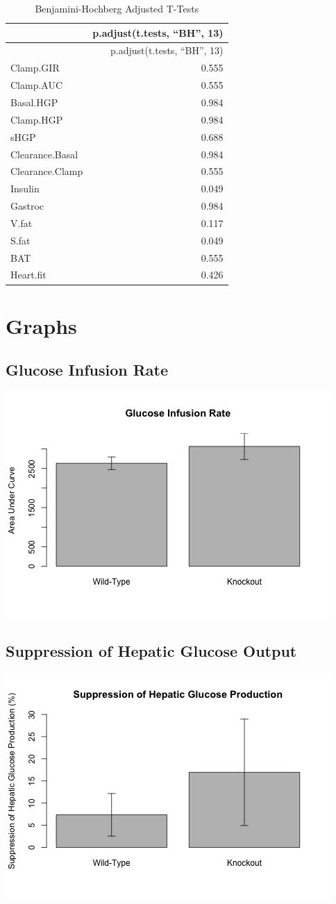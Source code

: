 \documentclass[]{article}
\begin{document}
\begin{longtable}[]{@{}lr@{}}
\caption{Benjamini-Hochberg Adjusted T-Tests}\tabularnewline
\toprule
& p.adjust(t.tests, ``BH'', 13)\tabularnewline
\midrule
\endfirsthead
\toprule
& p.adjust(t.tests, ``BH'', 13)\tabularnewline
\midrule
\endhead
Clamp.GIR & 0.555\tabularnewline
Clamp.AUC & 0.555\tabularnewline
Basal.HGP & 0.984\tabularnewline
Clamp.HGP & 0.984\tabularnewline
sHGP & 0.688\tabularnewline
Clearance.Basal & 0.984\tabularnewline
Clearance.Clamp & 0.555\tabularnewline
Insulin & 0.049\tabularnewline
Gastroc & 0.984\tabularnewline
V.fat & 0.117\tabularnewline
S.fat & 0.049\tabularnewline
BAT & 0.555\tabularnewline
Heart.fit & 0.426\tabularnewline
\bottomrule
\end{longtable}

\section{Graphs}\label{graphs}

\subsection{Glucose Infusion Rate}\label{glucose-infusion-rate}

\includegraphics{figures/gir-1.png}

\subsection{Suppression of Hepatic Glucose
Output}\label{suppression-of-hepatic-glucose-output}

\includegraphics{figures/sHGP-1.png}
\end{document}
